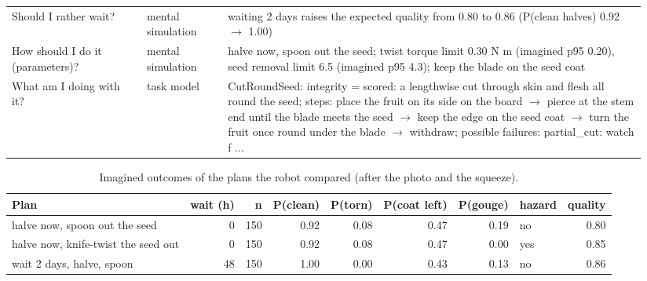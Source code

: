 \documentclass[10.5pt,a4paper]{article}
\begin{document}
{\begin{longtable}{@{}p{0.2\linewidth}p{0.12\linewidth}p{0.62\linewidth}@{}}
Should I rather wait? & mental simulation & waiting 2 days raises the expected quality from 0.80 to 0.86 (P(clean halves) 0.92 $\to$ 1.00) \\
How should I do it (parameters)? & mental simulation & halve now, spoon out the seed; twist torque limit 0.30 N m (imagined p95 0.20), seed removal limit 6.5 (imagined p95 4.3); keep the blade on the seed coat \\
What am I doing with it? & task model & CutRoundSeed: integrity = scored: a lengthwise cut through skin and flesh all round the seed; steps: place the fruit on its side on the board $\to$ pierce at the stem end until the blade meets the seed $\to$ keep the edge on the seed coat $\to$ turn the fruit once round under the blade $\to$ withdraw; possible failures: partial\_cut: watch f ... \\\bottomrule\end{longtable}}
\begin{table}[htbp]\centering\scriptsize\caption{Imagined outcomes of the plans the robot compared (after the photo and the squeeze).}
\begin{tabularx}{\linewidth}{@{}Xrrrrrrlr@{}}\toprule Plan & wait (h) & n & P(clean) & P(torn) & P(coat left) & P(gouge) & hazard & quality \\\midrule
halve now, spoon out the seed & 0 & 150 & 0.92 & 0.08 & 0.47 & 0.19 & no & 0.80 \\
halve now, knife-twist the seed out & 0 & 150 & 0.92 & 0.08 & 0.47 & 0.00 & yes & 0.85 \\
wait 2 days, halve, spoon & 48 & 150 & 1.00 & 0.00 & 0.43 & 0.13 & no & 0.86 \\\bottomrule\end{tabularx}\end{table}
\end{document}
